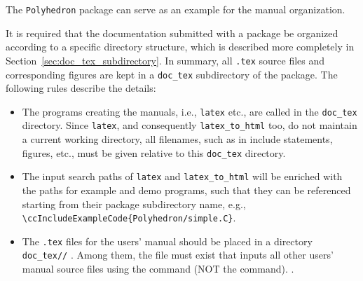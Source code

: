 The \texttt{Polyhedron} package can serve as an example for the manual
organization.

It is required that the documentation submitted with a package be organized
according to a specific directory structure, which is described more
completely in Section~\ref{sec:doc_tex_subdirectory}. In summary, all
{\tt .tex} source files and corresponding figures are kept in a 
\texttt{doc\_tex} subdirectory of the package. The following rules
describe the details:

\begin{itemize}  
   \item The programs creating the manuals, i.e., \texttt{latex} etc.,
         are called in the \texttt{doc\_tex} directory. Since
         \texttt{latex}, and consequently \texttt{latex\_to\_html}
         too, do not maintain a current working directory, all
         filenames, such as in include statements, figures, etc., must
         be given relative to this \texttt{doc\_tex} directory.
   \item The input search paths of \texttt{latex} and
         \texttt{latex\_to\_html} will be enriched with the paths for
         example and demo programs, such that they can be referenced
         starting from their package subdirectory name, e.g., 
         \verb|\ccIncludeExampleCode{Polyhedron/simple.C}|.
   \item The {\tt .tex} files for the users' manual%
          should be placed in a 
         directory \verb|doc_tex/|\verb|/|%
         . Among
         them, the file 
         must exist that inputs all other users' 
         manual source files using the \verb|| command (NOT the
         \verb|| command).%
         .


\end{itemize}
